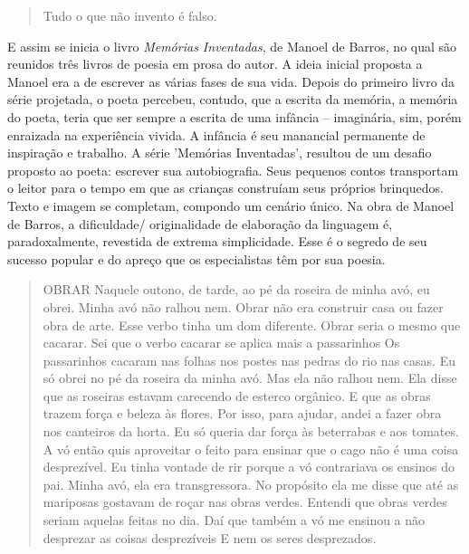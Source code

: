 \documentclass[11pt]{extarticle}
\begin{document}
\begin{quote}

Tudo o que não invento é falso.

\end{quote}

E assim se inicia o livro \textit{Memórias Inventadas}, de Manoel de Barros, no qual são reunidos três livros de poesia em prosa do autor. A ideia inicial proposta a Manoel era a de escrever as várias fases de sua vida. Depois do primeiro livro da série projetada, o poeta percebeu, contudo, que a escrita da memória, a memória do poeta, teria que ser sempre a escrita de uma infância – imaginária, sim, porém enraizada na experiência vivida. A infância é seu manancial permanente de inspiração e trabalho. A série 'Memórias Inventadas', resultou de um desafio proposto ao poeta: escrever sua autobiografia. Seus pequenos contos transportam o leitor para o tempo em que as crianças construíam seus próprios brinquedos. Texto e imagem se completam, compondo um cenário único. Na obra de Manoel de Barros, a dificuldade/ originalidade de elaboração da linguagem é, paradoxalmente, revestida de extrema simplicidade. Esse é o segredo de seu sucesso popular e do apreço que os especialistas têm por sua poesia.

\begin{quote}

OBRAR
Naquele outono, de tarde, ao pé da roseira de minha avó, eu obrei. Minha avó não ralhou nem. Obrar não era construir casa ou fazer obra de arte. Esse verbo tinha um dom diferente. Obrar seria o mesmo que cacarar. Sei que o verbo cacarar se aplica mais a passarinhos Os passarinhos cacaram nas folhas nos postes nas pedras do rio nas casas. Eu só obrei no pé da roseira da minha avó. Mas ela não ralhou nem. Ela disse que as roseiras estavam carecendo de esterco orgânico. E que as obras trazem força e beleza às flores. Por isso, para ajudar, andei a fazer obra nos canteiros da horta. Eu só queria dar força às beterrabas e aos tomates. A vó então quis aproveitar o feito para ensinar que o cago não é uma coisa desprezível. Eu tinha vontade de rir porque a vó contrariava os ensinos do pai. Minha avó, ela era transgressora. No propósito ela me disse que até as mariposas gostavam de roçar nas obras verdes. Entendi que obras verdes seriam aquelas feitas no dia. Daí que também a vó me ensinou a não desprezar as coisas desprezíveis E nem os seres desprezados. 


\end{quote}
\end{document}

